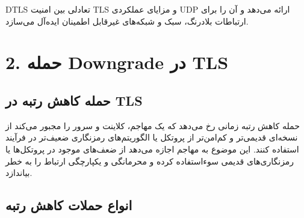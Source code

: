 DTLS تعادلی بین امنیت TLS و مزایای عملکردی UDP ارائه می‌دهد و آن را برای ارتباطات بلادرنگ، سبک و شبکه‌های غیرقابل اطمینان ایده‌آل می‌سازد.

\section*{2. حمله Downgrade در TLS}
\subsection*{حمله کاهش رتبه در TLS}

حمله کاهش رتبه  زمانی رخ می‌دهد که یک مهاجم، کلاینت و سرور را مجبور می‌کند از نسخه‌ای قدیمی‌تر و کم‌امن‌تر از پروتکل یا الگوریتم‌های رمزنگاری ضعیف‌تر در فرآیند  استفاده کنند. این موضوع به مهاجم اجازه می‌دهد از ضعف‌های موجود در پروتکل‌ها یا رمزنگاری‌های قدیمی سوءاستفاده کرده و محرمانگی و یکپارچگی ارتباط را به خطر بیاندازد.

\subsection*{انواع حملات کاهش رتبه}

